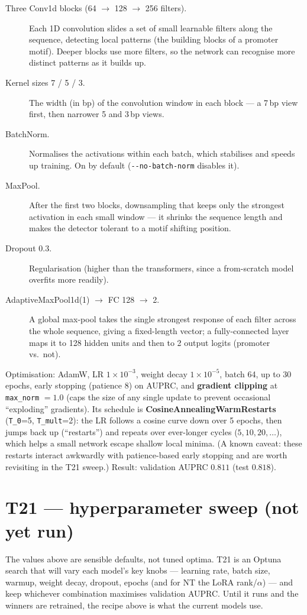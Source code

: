 \documentclass{article}
\begin{document}
\begin{description}
\item[Three Conv1d blocks (64 $\to$ 128 $\to$ 256 filters).] Each 1D convolution slides a set of small learnable filters along the sequence, detecting local patterns (the building blocks of a promoter motif). Deeper blocks use more filters, so the network can recognise more distinct patterns as it builds up.
\item[Kernel sizes 7 / 5 / 3.] The width (in bp) of the convolution window in each block --- a 7\,bp view first, then narrower 5 and 3\,bp views.
\item[BatchNorm.] Normalises the activations within each batch, which stabilises and speeds up training. On by default (\texttt{-{}-no-batch-norm} disables it).
\item[MaxPool.] After the first two blocks, downsampling that keeps only the strongest activation in each small window --- it shrinks the sequence length and makes the detector tolerant to a motif shifting position.
\item[Dropout 0.3.] Regularisation (higher than the transformers, since a from-scratch model overfits more readily).
\item[AdaptiveMaxPool1d(1) $\to$ FC 128 $\to$ 2.] A global max-pool takes the single strongest response of each filter across the whole sequence, giving a fixed-length vector; a fully-connected layer maps it to 128 hidden units and then to 2 output logits (promoter vs.\ not).
\end{description}

\noindent Optimisation: AdamW, LR $1\times10^{-3}$, weight decay $1\times10^{-5}$, batch 64, up to 30 epochs, early stopping (patience 8) on AUPRC, and \textbf{gradient clipping} at \texttt{max\_norm} $=1.0$ (caps the size of any single update to prevent occasional ``exploding'' gradients). Its schedule is \textbf{CosineAnnealingWarmRestarts} (\texttt{T\_0}=5, \texttt{T\_mult}=2): the LR follows a cosine curve down over 5 epochs, then jumps back up (``restarts'') and repeats over ever-longer cycles ($5, 10, 20, \dots$), which helps a small network escape shallow local minima. (A known caveat: these restarts interact awkwardly with patience-based early stopping and are worth revisiting in the T21 sweep.) Result: validation AUPRC $0.811$ (test $0.818$).

\section{T21 --- hyperparameter sweep (not yet run)}
The values above are sensible defaults, not tuned optima. T21 is an Optuna search that will vary each model's key knobs --- learning rate, batch size, warmup, weight decay, dropout, epochs (and for NT the LoRA rank/$\alpha$) --- and keep whichever combination maximises validation AUPRC. Until it runs and the winners are retrained, the recipe above is what the current models use.
\end{document}
